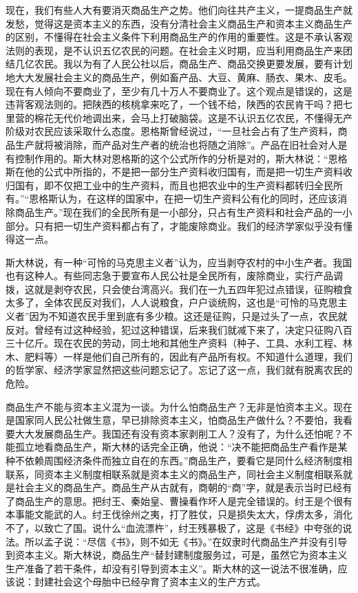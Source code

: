 现在，我们有些人大有要消灭商品生产之势。他们向往共产主义，一提商品生产就发愁，觉得这是资本主义的东西，没有分清社会主义商品生产和资本主义商品生产的区别，不懂得在社会主义条件下利用商品生产的作用的重要性。这是不承认客观法则的表现，是不认识五亿农民的问题。在社会主义时期，应当利用商品生产来团结几亿农民。我以为有了人民公社以后，商品生产、商品交换更要发展，要有计划地大大发展社会主义的商品生产，例如畜产品、大豆、黄麻、肠衣、果木、皮毛。现在有人倾向不要商业了，至少有几十万人不要商业了。这个观点是错误的，这是违背客观法则的。把陕西的核桃拿来吃了，一个钱不给，陕西的农民肯干吗？把七里营的棉花无代价地调出来，会马上打破脑袋。这是不认识五亿农民，不懂得无产阶级对农民应该采取什么态度。恩格斯曾经说过，“一旦社会占有了生产资料，商品生产就将被消除，而产品对生产者的统治也将随之消除”。产品在旧社会对人是有控制作用的。斯大林对恩格斯的这个公式所作的分析是对的，斯大林说：“恩格斯在他的公式中所指的，不是把一部分生产资料收归国有，而是把一切生产资料收归国有，即不仅把工业中的生产资料，而且也把农业中的生产资料都转归全民所有。”“恩格斯认为，在这样的国家中，在把一切生产资料公有化的同时，还应该消除商品生产。”现在我们的全民所有是一小部分，只占有生产资料和社会产品的一小部分。只有把一切生产资料都占有了，才能废除商业。我们的经济学家似乎没有懂得这一点。

斯大林说，有一种“可怜的马克思主义者”认为，应当剥夺农村的中小生产者。我国也有这种人。有些同志急于要宣布人民公社是全民所有，废除商业，实行产品调拨，这就是剥夺农民，只会使台湾高兴。我们在一九五四年犯过点错误，征购粮食太多了，全体农民反对我们，人人说粮食，户户谈统购，这也是“可怜的马克思主义者”因为不知道农民手里到底有多少粮。这还是征购，只是过头了一点，农民就反对。曾经有过这种经验，犯过这种错误，后来我们就减下来了，决定只征购八百三十亿斤。现在农民的劳动，同土地和其他生产资料（种子、工具、水利工程、林木、肥料等）一样是他们自己所有的，因此有产品所有权。不知道什么道理，我们的哲学家、经济学家显然把这些问题忘记了。忘记了这一点，我们就有脱离农民的危险。

商品生产不能与资本主义混为一谈。为什么怕商品生产？无非是怕资本主义。现在是国家同人民公社做生意，早已排除资本主义，怕商品生产做什么？不要怕，我看要大大发展商品生产。我国还有没有资本家剥削工人？没有了，为什么还怕呢？不能孤立地看商品生产，斯大林的话完全正确，他说：“决不能把商品生产看作是某种不依赖周围经济条件而独立自在的东西。”商品生产，要看它是同什么经济制度相联系，同资本主义制度相联系就是资本主义的商品生产，同社会主义制度相联系就是社会主义的商品生产。商品生产从古就有，商朝的“商”字，就是表示当时已经有了商品生产的意思。把纣王、秦始皇、曹操看作坏人是完全错误的。纣王是个很有本事能文能武的人。纣王伐徐州之夷，打了胜仗，只是损失太大，俘虏太多，消化不了，以致亡了国。说什么“血流漂杵”，纣王残暴极了，这是《书经》中夸张的说法。所以孟子说：“尽信《书》，则不如无《书》。”在奴隶时代商品生产并没有引导到资本主义。斯大林说，商品生产“替封建制度服务过，可是，虽然它为资本主义生产准备了若干条件，却没有引导到资本主义”。斯大林的这一说法不很准确，应该说：封建社会这个母胎中已经孕育了资本主义的生产方式。

